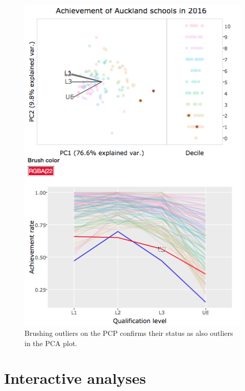 \documentclass[]{book}
\theoremstyle{definition}
\theoremstyle{definition}
\theoremstyle{definition}
\theoremstyle{remark}
\begin{document}
\begin{figure}[center]
\includegraphics[width=500px]{files/link_outPCP} \caption{Brushing outliers on the PCP confirms their status as also outliers in the PCA plot.}\label{fig:brushOutPCP}
\end{figure}

\section{Interactive analyses}\label{interactive-analyses}
\end{document}
